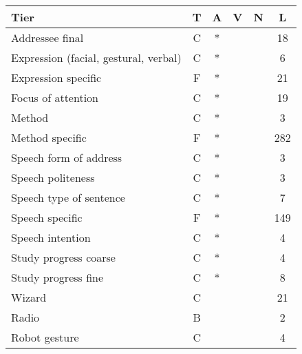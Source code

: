 \begin{table}[!ht]
    \centering
    \begin{tabulary}{\textwidth}{ l C C C C C }
        \toprule
        Tier                                  &  T   &    A      &   V     &     N       &      L   \\ \midrule
        Addressee final                       &  C   &    *      &         &             &     18   \\
        Expression (facial, gestural, verbal) &  C   &    *      &         &             &      6   \\
        Expression specific                   &  F   &    *      &         &             &     21   \\
        Focus of attention                    &  C   &    *      &         &             &     19   \\
        Method                                &  C   &    *      &         &             &      3   \\
        Method specific                       &  F   &    *      &         &             &    282   \\
        Speech form of address                &  C   &    *      &         &             &      3   \\
        Speech politeness                     &  C   &    *      &         &             &      3   \\
        Speech type of sentence               &  C   &    *      &         &             &      7   \\
        Speech specific                       &  F   &    *      &         &             &    149   \\
        Speech intention                      &  C   &    *      &         &             &      4   \\
        Study progress coarse                 &  C   &    *      &         &             &      4   \\
        Study progress fine                   &  C   &    *      &         &             &      8   \\
        Wizard                                &  C   &           &         &             &     21   \\
        Radio                                 &  B   &           &         &             &      2   \\
        Robot gesture                         &  C   &           &         &             &      4   \\

\end{tabulary}
\end{table}
